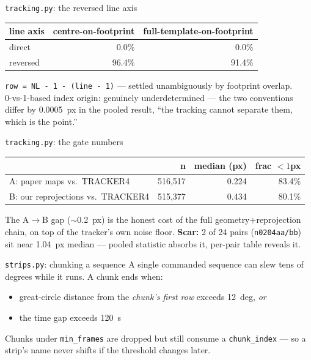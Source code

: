 \documentclass[aspectratio=169,11pt]{beamer}
\newcommand{\currevsec}{}
\newcommand{\revsec}[1]{\gdef\currevsec{#1}}
\begin{document}
\begin{frame}{\texttt{tracking.py}: the reversed line axis}
  \revsec{4.12}
  \small
  \begin{tabular}{lrr}
    \toprule
    line axis & centre-on-footprint & full-template-on-footprint \\
    \midrule
    direct & 0.0\% & 0.0\% \\
    reversed & 96.4\% & 91.4\% \\
    \bottomrule
  \end{tabular}\par
  \vspace{0.3cm}

  \texttt{row = NL - 1 - (line - 1)} --- settled unambiguously by footprint overlap. \\
  0-vs-1-based index origin: genuinely underdetermined --- the two conventions differ by 0.0005~px in the pooled result, ``the tracking cannot separate them, which is the point.''
\end{frame}

\begin{frame}{\texttt{tracking.py}: the gate numbers}
  \revsec{4.12}
  \small
  \begin{tabular}{lrrr}
    \toprule
     & n & median (px) & frac $<1$px \\
    \midrule
    A: paper maps vs.\ TRACKER4 & 516{,}517 & 0.224 & 83.4\% \\
    B: our reprojections vs.\ TRACKER4 & 515{,}377 & 0.434 & 80.1\% \\
    \bottomrule
  \end{tabular}\par
  \vspace{0.3cm}

  The A$\to$B gap ($\sim$0.2~px) is the honest cost of the full geometry+reprojection chain, on top of the tracker's own noise floor.
  \vspace{0.2cm}
  \textbf{Scar:} 2 of 24 pairs (\texttt{n0204aa/bb}) sit near 1.04~px median --- pooled statistic absorbs it, per-pair table reveals it.
\end{frame}

\begin{frame}{\texttt{strips.py}: chunking a sequence}
  \revsec{4.13}
  A single commanded sequence can slew tens of degrees while it runs. A chunk ends when:
  \begin{itemize}
    \item great-circle distance from the \emph{chunk's first row} exceeds 12~deg, \emph{or}
    \item the time gap exceeds 120~s
  \end{itemize}
  Chunks under \texttt{min\_frames} are dropped but still consume a \texttt{chunk\_index} --- so a strip's name never shifts if the threshold changes later.
\end{frame}
\end{document}
